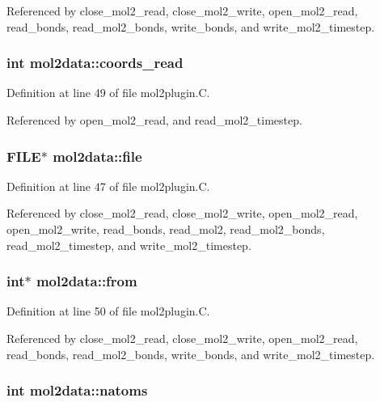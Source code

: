 Referenced by close\_\-mol2\_\-read, close\_\-mol2\_\-write, open\_\-mol2\_\-read, read\_\-bonds, read\_\-mol2\_\-bonds, write\_\-bonds, and write\_\-mol2\_\-timestep.
\subsubsection{\setlength{\rightskip}{0pt plus 5cm}int mol2data::coords\_\-read}\label{structmol2data_m5}




Definition at line 49 of file mol2plugin.C.

Referenced by open\_\-mol2\_\-read, and read\_\-mol2\_\-timestep.
\subsubsection{\setlength{\rightskip}{0pt plus 5cm}FILE$\ast$ mol2data::file}\label{structmol2data_m0}




Definition at line 47 of file mol2plugin.C.

Referenced by close\_\-mol2\_\-read, close\_\-mol2\_\-write, open\_\-mol2\_\-read, open\_\-mol2\_\-write, read\_\-bonds, read\_\-mol2, read\_\-mol2\_\-bonds, read\_\-mol2\_\-timestep, and write\_\-mol2\_\-timestep.
\subsubsection{\setlength{\rightskip}{0pt plus 5cm}int$\ast$ mol2data::from}\label{structmol2data_m6}




Definition at line 50 of file mol2plugin.C.

Referenced by close\_\-mol2\_\-read, close\_\-mol2\_\-write, open\_\-mol2\_\-read, read\_\-bonds, read\_\-mol2\_\-bonds, write\_\-bonds, and write\_\-mol2\_\-timestep.
\subsubsection{\setlength{\rightskip}{0pt plus 5cm}int mol2data::natoms}\label{structmol2data_m2}




